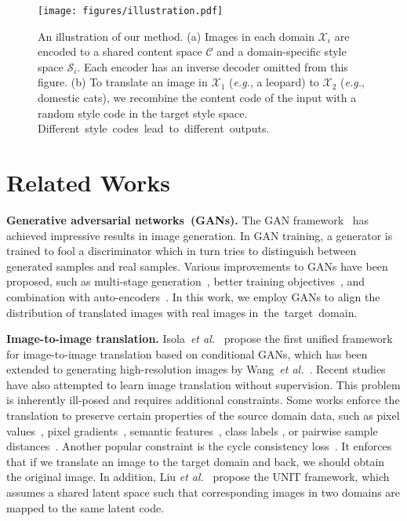 \documentclass[runningheads]{llncs}
\newcommand{\vpara}[1]{\vspace{0.05in}\noindent\textbf{#1}}
\def\etal{\emph{et al.}\xspace}
\begin{document}
	
	\begin{figure*}[!tb]
		\centering
		\texttt{[image: figures/illustration.pdf]}
		\caption{An illustration of our method. (a) Images in each domain $\mathcal{X}_{i}$ are encoded to a shared content space $\mathcal{C}$ and a domain-specific style space $\mathcal{S}_{i}$. Each encoder has an inverse decoder omitted from this figure. (b) To translate an image in $\mathcal{X}_{1}$ (\textit{e.g.}, a leopard) to $\mathcal{X}_{2}$ (\textit{e.g.}, domestic cats), we recombine the content code of the input with a random style code in the target style space. \mbox{Different style codes lead to different outputs.}}
		\label{fig:illustration}
	\end{figure*}
	
	\section{Related Works}	\label{sec::related}

	\vpara{Generative adversarial networks~(GANs).} The GAN framework~\cite{goodfellow2014generative} has achieved impressive results in image generation. In GAN training, a generator is trained to fool a discriminator which in turn tries to distinguish between generated samples and real samples.
	Various improvements to GANs have been proposed, such as multi-stage generation~\cite{denton2015deep,wang2016generative,yang2017lrgan,huang2017sgan,zhang2017stackgan,karras2018progressive}, better training objectives~\cite{salimans2016improved,zhao2016energy,arjovsky2017wasserstein,berthelot2017began,mao2017least,tolstikhin2018wasserstein}, and combination with auto-encoders~\cite{larsen2016autoencoding,dosovitskiy2016generating,rosca2017variational,li2017alice,srivastava2017veegan}. 
	In this work, we employ GANs to align the distribution of translated images with real images \mbox{in the target domain.}
	
	\vpara{Image-to-image translation.} Isola~\etal~\cite{isola2017image} propose the first unified framework for image-to-image translation based on conditional GANs, which has been extended to generating high-resolution images by Wang~\etal~\cite{wang2018high}. 
Recent studies have also attempted to learn image translation without supervision. 
	This problem is inherently ill-posed and requires additional constraints.
	Some works enforce the translation to preserve certain properties of the source domain data, such as pixel values~\cite{shrivastava2017learning}, pixel gradients~\cite{bousmalis2017unsupervised}, semantic features~\cite{taigman2017unsupervised}, class labels \cite{bousmalis2017unsupervised}, or pairwise sample distances~\cite{benaim2017one}. Another popular constraint is the cycle consistency loss~\cite{yi2017dualgan,zhu2017unpaired,kim2017learning}. It enforces that if we translate an image to the target domain and back, we should obtain the original image. In addition, Liu \etal~\cite{liu2017unsupervised} propose the UNIT framework, which assumes a shared latent space such that corresponding images in two domains are mapped to the same latent code. 
\end{document}
